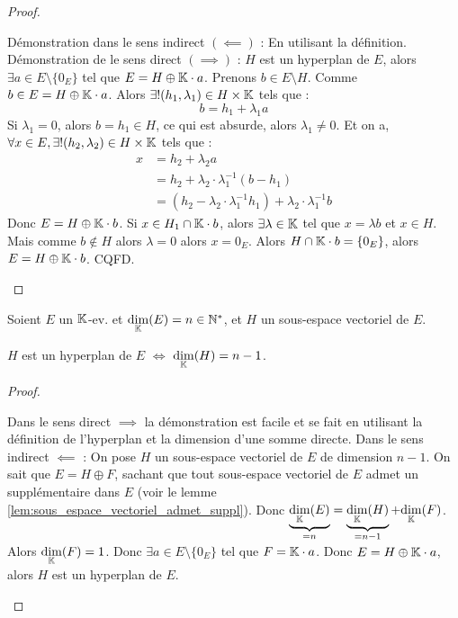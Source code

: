 \documentclass[12pt,a4paper]{report}
\begin{document}
\begin{proof}
    \begin{outline}
        \1 Démonstration dans le sens indirect $(\impliedby)$ : En utilisant la définition.
        \1 Démonstration de le sens direct $(\implies)$ :
        \2 $H$ est un hyperplan de $E$, alors $\exists a \in E\setminus\{0_E\}$ tel que $E = H \oplus \mathbb{K} \cdot a$.
        \2 Prenons $b \in E\setminus H$.
        \2 Comme $b \in E = H \oplus \mathbb{K} \cdot a$.
        \2 Alors $\exists ! (h_1,\lambda_1) \in H\times\mathbb{K}$ tels que : 
        $$b = h_1 + \lambda_1 a$$
        \2 Si $\lambda_1 = 0$, alors $b = h_1 \in H$, ce qui est absurde, alors $\lambda_1 \ne 0$.
        \2 Et on a, $\forall x \in E, \exists ! (h_2,\lambda_2) \in H\times\mathbb{K}$ tels que :
        \begin{align*}
            x &= h_2 + \lambda_2 a \\
            &= h_2 + \lambda_2 \cdot \lambda_1^{-1} (b - h_1) \\
            &= (h_2 - \lambda_2 \cdot \lambda_1^{-1} h_1) + \lambda_2 \cdot \lambda_1^{-1} b
        \end{align*}
        \2 Donc $E = H \oplus \mathbb{K} \cdot b$.
        \2 Si $x \in H_1 \cap \mathbb{K} \cdot b$, alors $\exists \lambda \in \mathbb{K}$ tel que $x = \lambda b$ et $x\in H$.
        \2 Mais comme $b \notin H$ alors $\lambda = 0$ alors $x = 0_E$.
        \2 Alors $H \cap \mathbb{K} \cdot b = \{0_E\}$, alors $E = H \oplus \mathbb{K} \cdot b$. CQFD.
    \end{outline}
\end{proof}

\begin{property}
    Soient $E$ un $\mathbb{K}$-ev. et $\underset{\mathbb{K}}\dim(E) = n \in \mathbb{N}^*$, et $H$ un sous-espace vectoriel de $E$.

    $H$ est un hyperplan de $E$ $\iff$ $\underset{\mathbb{K}}\dim(H) = n-1$.
\end{property}

\begin{proof}
    \begin{outline}
        \1 Dans le sens direct $\implies$ la démonstration est facile et se fait en utilisant la définition de l'hyperplan et la dimension d'une somme directe.
        \1 Dans le sens indirect $\impliedby$ :
        \2 On pose $H$ un sous-espace vectoriel de $E$ de dimension $n-1$.
        \2 On sait que $E = H \oplus F$, sachant que tout sous-espace vectoriel de $E$ admet un supplémentaire dans $E$ (voir le lemme \ref{lem:sous_espace_vectoriel_admet_suppl}).
        \2 Donc $\underbrace{\underset{\mathbb{K}}\dim(E)}_{=n} = \underbrace{\underset{\mathbb{K}}\dim(H)}_{=n-1} + \underset{\mathbb{K}}\dim(F)$.
        \2 Alors $\underset{\mathbb{K}}\dim(F) = 1$.
        \2 Donc $\exists a \in E\setminus\{0_E\}$ tel que $F = \mathbb{K} \cdot a$.
        \2 Donc $E = H \oplus \mathbb{K} \cdot a$, alors $H$ est un hyperplan de $E$.
    \end{outline}
\end{proof}
\end{document}
